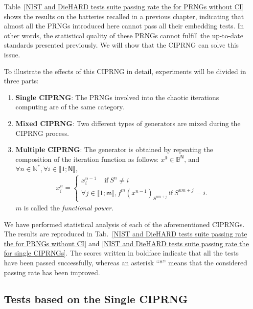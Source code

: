 Table~\ref{NIST and DieHARD tests suite passing rate the for PRNGs without CI} shows the results on the batteries recalled in a
previous chapter, indicating that almost all the PRNGs introduced here cannot pass all their embedding tests. In other words, the statistical quality of these PRNGs cannot fulfill the up-to-date standards presented previously. We will show that the CIPRNG can solve this issue.

To illustrate the effects of this CIPRNG in detail, experiments will be divided in three parts:
\begin{enumerate}
  \item \textbf{Single CIPRNG}: The PRNGs involved into the chaotic iterations computing are of the same category.
  \item \textbf{Mixed CIPRNG}: Two different types of generators are mixed during the CIPRNG process.
  \item \textbf{Multiple CIPRNG}: The generator is obtained by repeating the composition of the iteration function as follows: $x^0\in \mathds{B}^{\mathsf{N}}$, and $\forall n\in \mathds{N}^{\ast },\forall i\in \llbracket1;\mathsf{N}\rrbracket,$
\begin{equation}
\begin{array}{l}
x_i^n=\left\{
\begin{array}{l}
x_i^{n-1}~~~~~\text{if}~S^n\neq i \\
\forall j\in \llbracket1;\mathsf{m}\rrbracket,f^m(x^{n-1})_{S^{nm+j}}~\text{if}~S^{nm+j}=i.\end{array} \right. \end{array}
\end{equation}
$m$ is called the \emph{functional power}.
\end{enumerate}


We have performed statistical analysis of each of the aforementioned CIPRNGs.
The results are reproduced in Tab.~\ref{NIST and DieHARD tests suite passing rate the for PRNGs without CI} and \ref{NIST and DieHARD tests suite passing rate the for single CIPRNGs}.
The scores written in boldface indicate that all the tests have been passed successfully, whereas an asterisk ``*'' means that the considered passing rate has been improved.
\subsection{Tests based on the Single CIPRNG}

